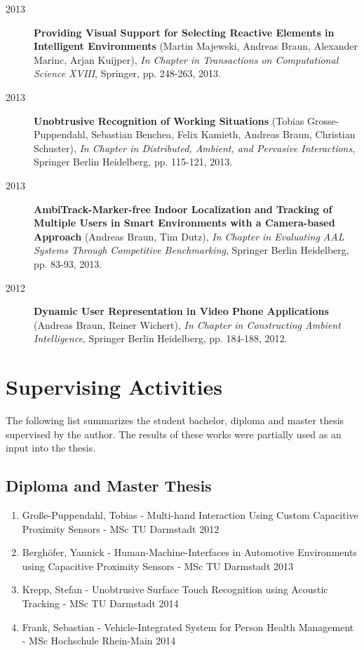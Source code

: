 \begin{appendix}
\begin{description}
\item[2013]{\bf Providing Visual Support for Selecting Reactive Elements in Intelligent Environments} (Martin Majewski, Andreas Braun, Alexander Marinc, Arjan Kuijper), {\em In Chapter in Transactions on Computational Science XVIII}, Springer, pp. 248-263, 2013.
\item[2013]{\bf Unobtrusive Recognition of Working Situations} (Tobias Grosse-Puppendahl, Sebastian Benchea, Felix Kamieth, Andreas Braun, Christian Schuster), {\em In Chapter in Distributed, Ambient, and Pervasive Interactions}, Springer Berlin Heidelberg, pp. 115-121, 2013.
\item[2013]{\bf AmbiTrack-Marker-free Indoor Localization and Tracking of Multiple Users in Smart Environments with a Camera-based Approach} (Andreas Braun, Tim Dutz), {\em In Chapter in Evaluating AAL Systems Through Competitive Benchmarking}, Springer Berlin Heidelberg, pp. 83-93, 2013.
\item[2012]{\bf Dynamic User Representation in Video Phone Applications} (Andreas Braun, Reiner Wichert), {\em In Chapter in Constructing Ambient Intelligence}, Springer Berlin Heidelberg, pp. 184-188, 2012.
\end{description}

\newpage


\chapter{Supervising Activities}

The following list summarizes the student bachelor, diploma and master thesis supervised by the author. The results of these works were partially used as an input into the thesis.

\section{Diploma and Master Thesis}

\begin{enumerate}
\item Große-Puppendahl, Tobias - Multi-hand Interaction Using Custom Capacitive Proximity Sensors - MSc TU Darmstadt 2012 
\item Berghöfer, Yannick - Human-Machine-Interfaces in Automotive Environments using Capacitive Proximity Sensors - MSc TU Darmstadt 2013
\item Krepp, Stefan - Unobtrusive Surface Touch Recognition using Acoustic Tracking - MSc TU Darmstadt 2014
\item Frank, Sebastian - Vehicle-Integrated System for Person Health Management - MSc Hochschule Rhein-Main 2014
\end{enumerate}


\end{appendix}
